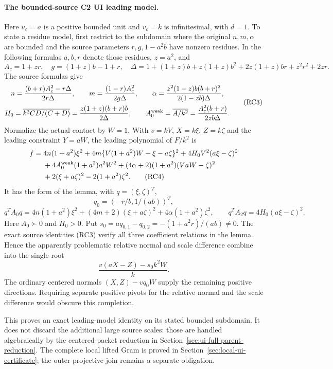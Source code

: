 \paragraph{The bounded-source C2 UI leading model.}
Here $u_c=a$ is a positive bounded unit and $v_c=k$ is
infinitesimal, with $d=1$. To state a residue model, first restrict
to the subdomain where the original $n,m,\alpha$ are bounded and
the source parameters $r,g,1-a^2b$ have nonzero residues. In the
following formulas $a,b,r$ denote those residues, $z=a^2$, and
\[
 A_c=1+zr,\quad g=(1+z)b-1+r,\quad
 \Delta=1+(1+z)b+z(1+z)b^2+2z(1+z)br+z^2r^2+2zr.
\]
The source formulas give
\[
\begin{gathered}
 n=\frac{(b+r)A_c^2-r\Delta}{2r\Delta},\qquad
 m=\frac{(1-r)A_c^2}{2g\Delta},\qquad
 \alpha=\frac{z^2(1+z)b(b+r)^2}{2(1-zb)\Delta},\\
 H_0=\overline{k^2CD/(C+D)}
       =\frac{z(1+z)(b+r)b}{2\Delta},\qquad
 A_0^{\rm weak}=\overline{A/k^2}
       =\frac{A_c^2(b+r)}{2zb\Delta}.
\end{gathered}                                                   \tag{RC3}
\]
Normalize the actual contact by $W=1$. With $v=kV$, $X=k\xi$,
$Z=k\zeta$ and the leading constraint $Y=aW$, the leading
polynomial of $F/k^2$ is
\begin{align*}
 f={}&4n(1+a^2)\xi^2
 +4m\{V(1+a^2)W-\xi-a\zeta\}^2
 +4H_0V^2(a\xi-\zeta)^2\\
 &+4A_0^{\rm weak}(1+a^2)a^2W^2
 +(4\alpha+2)(1+a^2)(VaW-\zeta)^2\\
 &+2(\xi+a\zeta)^2-2(1+a^2)\zeta^2.               \tag{RC4}
\end{align*}
It has the form of the lemma, with $q=(\xi,\zeta)^T$,
\[
 q_0=(-r/b,1/(ab))^T,
\]
\[
 q^TA_0q=4n(1+a^2)\xi^2+(4m+2)(\xi+a\zeta)^2
                      +4\alpha(1+a^2)\zeta^2,
 \qquad q^TA_2q=4H_0(a\xi-\zeta)^2.
\]
Here $A_0\succ0$ and $H_0>0$. Put
$s_0=aq_{0,1}-q_{0,2}=-(1+a^2r)/(ab)\ne0$.
The exact source identities (RC3) verify all three coefficient
relations in the lemma. Hence the apparently problematic relative
normal and scale difference combine into the single root
\[
             \frac{v(aX-Z)-s_0k^2W}{k}.             \tag{RC5}
\]
The ordinary centered normals $(X,Z)-vq_0W$ supply the remaining
positive directions. Requiring separate positive pivots for the
relative normal and the scale difference would obscure this
completion.

This proves an exact leading-model identity on its stated bounded
subdomain. It does not discard the additional large source scales:
those are handled algebraically by the centered-packet reduction in
Section~\ref{sec:ui-full-parent-reduction}. The complete local lifted
Gram is proved in Section~\ref{sec:local-ui-certificate}; the outer
projective join remains a separate obligation.
